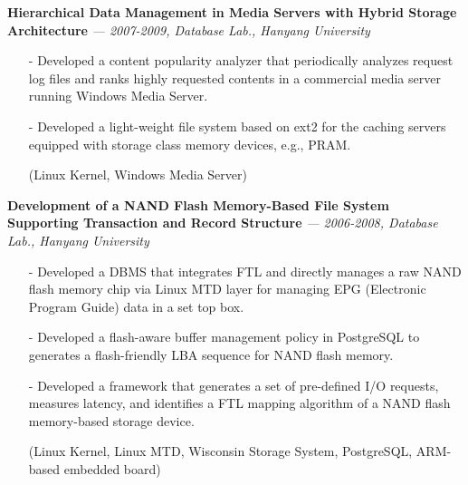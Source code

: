   \vspace{-0.15in}
  {\bf Hierarchical Data Management in Media Servers with Hybrid Storage Architecture}
    {\it \footnotesize --- 2007-2009, Database Lab., Hanyang University}
    \begin{itemize}[leftmargin=*]
    \setlength\itemsep{-0.02in}
    \item[-] Developed a content popularity analyzer that periodically analyzes 
             request log files and ranks highly requested contents
             in a commercial media server running Windows Media Server.
    \item[-] Developed a light-weight file system based on ext2
             for the caching servers equipped with 
             storage class memory devices, e.g., PRAM.
    \item[] {\small(Linux Kernel, Windows Media Server)}
    \end{itemize}
  \vspace{-0.15in}
  {\bf Development of a NAND Flash Memory-Based File System Supporting Transaction and
      Record Structure} 
    {\it \footnotesize --- 2006-2008, Database Lab., Hanyang University}
    \begin{itemize}[leftmargin=*]
    \setlength\itemsep{-0.02in}
    \item[-] Developed a DBMS that integrates FTL and directly manages a raw NAND flash
             memory chip via Linux MTD layer for managing EPG (Electronic Program Guide)
             data in a set top box.
    \item[-] Developed a flash-aware buffer management policy in PostgreSQL
             to generates a flash-friendly LBA sequence for NAND flash memory.
    \item[-] Developed a framework that generates a set of pre-defined I/O
             requests, measures latency,
	     and identifies a FTL mapping algorithm
             of a NAND flash memory-based
             storage device.
    \item[] {\small(Linux Kernel, Linux MTD, Wisconsin Storage System, PostgreSQL,
             ARM-based embedded board)}
    \end{itemize}

